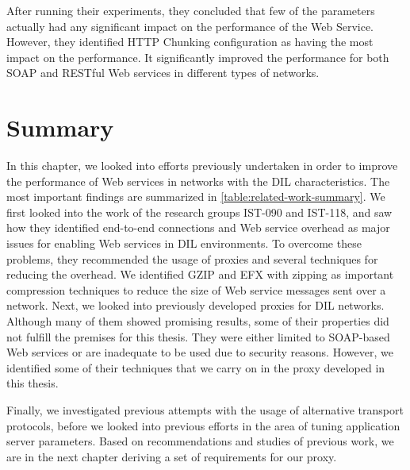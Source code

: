 After running their experiments, they concluded that few of the parameters
actually had any significant impact on the performance of the Web Service.
However, they identified HTTP Chunking configuration as having the most impact
on the performance. It significantly improved the performance for both SOAP and
RESTful Web services in different types of networks.


\section{Summary}

In this chapter, we looked into efforts previously undertaken in order to
improve the performance of Web services in networks with the DIL
characteristics. The most important findings are summarized in
\cref{table:related-work-summary}. We first looked into the work of the research
groups IST-090 and IST-118, and saw how they identified end-to-end connections
and Web service overhead as major issues for enabling Web services in DIL
environments. To overcome these problems, they recommended the usage of proxies
and several techniques for reducing the overhead. We identified GZIP and EFX
with zipping as important compression techniques to reduce the size of Web
service messages sent over a network. Next, we looked into previously developed
proxies for DIL networks. Although many of them showed promising results, some
of their properties did not fulfill the premises for this thesis. They were
either limited to SOAP-based Web services or are inadequate to be used due to
security reasons. However, we identified some of their techniques that we carry
on in the proxy developed in this thesis.

Finally, we investigated previous attempts with the usage of alternative
transport protocols, before we looked into previous efforts in the area of
tuning application server parameters. Based on recommendations and studies of
previous work, we are in the next chapter deriving a set of requirements for our
proxy.
